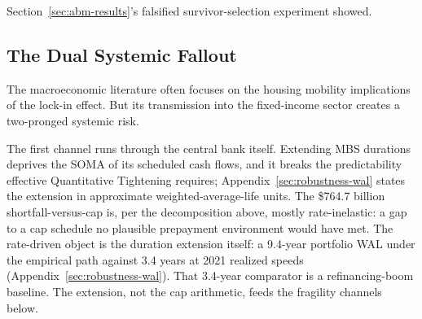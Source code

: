 \documentclass[12pt]{article}
\begin{document}
Section~\ref{sec:abm-results}'s falsified survivor-selection experiment showed.

\subsection{The Dual Systemic Fallout}\label{sec:discussion-fallout}

The macroeconomic literature often focuses on the housing mobility implications of the lock-in effect. But its transmission into the fixed-income sector creates a two-pronged systemic risk.

The first channel runs through the central bank itself. Extending MBS durations deprives the SOMA of its scheduled cash flows, and it breaks the predictability effective Quantitative Tightening requires; Appendix~\ref{sec:robustness-wal} states the extension in approximate weighted-average-life units. The \$764.7 billion shortfall-versus-cap is, per the decomposition above, mostly rate-inelastic: a gap to a cap schedule no plausible prepayment environment would have met. The rate-driven object is the duration extension itself: a 9.4-year portfolio WAL under the empirical path against 3.4 years at 2021 realized speeds (Appendix~\ref{sec:robustness-wal}). That 3.4-year comparator is a refinancing-boom baseline. The extension, not the cap arithmetic, feeds the fragility channels below.
\end{document}
